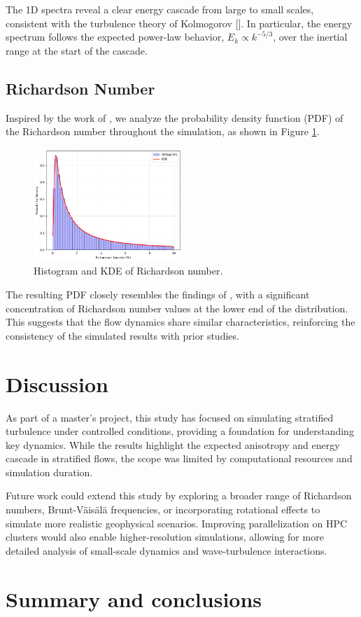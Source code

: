 \documentclass[final,5p,times,twocolumn,authoryear]{elsarticle}
\begin{document}
The 1D spectra reveal a clear energy cascade from large to small scales, consistent with the turbulence theory of Kolmogorov [\cite{kolmogorov_local_1941}]. In particular, the energy spectrum follows the expected power-law behavior, $E_k \propto k^{-5/3}$, over the inertial range at the start of the cascade.

\subsection{Richardson Number}

Inspired by the work of \cite{brethouwer_scaling_2007}, we analyze the probability density function (PDF) of the Richardson number throughout the simulation, as shown in Figure \ref{fig:Ri PDF}.

\begin{figure}[h]
\centering
\includegraphics[width=0.5\textwidth]{fig/richardson_pdf.png}
\caption{Histogram and KDE of Richardson number.}
\label{fig:Ri PDF}
\end{figure}

The resulting PDF closely resembles the findings of \cite{brethouwer_scaling_2007}, with a significant concentration of Richardson number values at the lower end of the distribution. This suggests that the flow dynamics share similar characteristics, reinforcing the consistency of the simulated results with prior studies.


\section{Discussion}

As part of a master’s project, this study has focused on simulating stratified turbulence under controlled conditions, providing a foundation for understanding key dynamics. While the results highlight the expected anisotropy and energy cascade in stratified flows, the scope was limited by computational resources and simulation duration. 

Future work could extend this study by exploring a broader range of Richardson numbers, Brunt-Väisälä frequencies, or incorporating rotational effects to simulate more realistic geophysical scenarios. Improving parallelization on HPC clusters would also enable higher-resolution simulations, allowing for more detailed analysis of small-scale dynamics and wave-turbulence interactions.

\section{Summary and conclusions}

 

\end{document}
